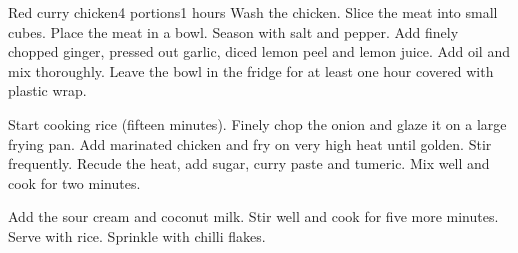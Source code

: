 \documentclass{article}
\begin{document}
\begin{recipe}{Red curry chicken}{4 portions}{1 hours}
Wash the chicken. Slice the meat into small cubes. Place the meat in a bowl. Season with salt and pepper. 
Add finely chopped ginger, pressed out garlic, diced lemon peel and lemon juice. Add oil and mix thoroughly. 
Leave the bowl in the fridge for at least one hour covered with plastic wrap.

Start cooking rice (fifteen minutes). Finely chop the onion and glaze it on a large frying pan. Add marinated chicken 
and fry on very high heat until golden. Stir frequently. Recude the heat, add sugar, curry paste and tumeric. 
Mix well and cook for two minutes.

Add the sour cream and coconut milk. Stir well and cook for five more minutes.
Serve with rice. Sprinkle with chilli flakes. 

\end{recipe}
\end{document}
